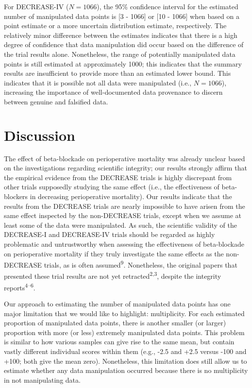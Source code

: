 \documentclass[]{article}
\begin{document}
For DECREASE-IV (\(N=1066\)), the 95\% confidence interval for the
estimated number of manipulated data points is {[}3 - 1066{]} or {[}10 -
1066{]} when based on a point estimate or a more uncertain distribution
estimate, respectively. The relatively minor difference between the
estimates indicates that there is a high degree of confidence that data
manipulation did occur based on the difference of the trial results
alone. Nonetheless, the range of potentially manipulated data points is
still estimated at approximately 1000; this indicates that the summary
results are insufficient to provide more than an estimated lower bound.
This indicates that it is possible not all data were manipulated (i.e.,
\(N=1066\)), increasing the importance of well-documented data
provenance to discern between genuine and falsified data.

\section{Discussion}\label{discussion}

The effect of beta-blockade on perioperative mortality was already
unclear based on the investigations regarding scientific integrity; our
results strongly affirm that the empirical evidence from the DECREASE
trials is highly discrepant from other trials supposedly studying the
same effect (i.e., the effectiveness of beta-blockers in decreasing
perioperative mortality). Our results indicate that the results from the
DECREASE trials are nearly impossible to have arisen from the same
effect inspected by the non-DECREASE trials, except when we assume at
least some of the data were manipulated. As such, the scientific
validity of the DECREASE-I and DECREASE-IV trials should be regarded as
highly problematic and untrustworthy when assessing the effectiveness of
beta-blockade on perioperative mortality if they truly investigate the
same effects as the non-DECREASE trials, as is often
assumed\textsuperscript{9}. Nonetheless, the original papers that
presented these trial results are not yet
retracted\textsuperscript{2,3}, despite the integrity
reports\textsuperscript{4--6}.

Our approach to estimating the number of manipulated data points has one
major limitation that we would like to highlight: multiplicity. For each
estimated proportion of manipulated data points, there is another
smaller (or larger) proportion with more (or less) extremely manipulated
data points. This problem is similar to how various samples can give
rise to the same mean, but contain vastly different individual scores
within them (e.g., -2.5 and +2.5 versus -100 and +100; both give the
mean zero). Nonetheless, this limitation does still allow us to estimate
whether any data manipulation occurred because there is no multiplicity
in not manipulating data.
\end{document}

